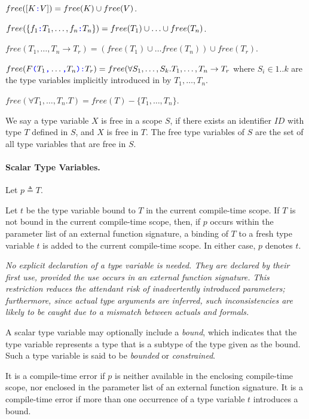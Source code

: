 \documentclass{article}
\begin{document}
 $free([K \texttt{\color{blue} :}{} V]) = free(K) \cup free(V)$.
 
 $free(\{f_1\texttt{\color{blue} :}{} T_1, \ldots, f_n\texttt{\color{blue} :}{} T_n\}) =  free(T_1) \cup \ldots \cup free(T_n)$.
 
 $free(T_1, \ldots, T_n \to T_r) = (free(T_1) \cup \ldots free(T_n)) \cup free(T_r)$. 
 
 $free(F\texttt{\color{blue} (}{} T_1\texttt{\color{blue} ,}{} \ldots\texttt{\color{blue} ,}{} T_n\texttt{\color{blue} )}\texttt{\color{blue} :}{}T_r) = free(\forall S_1, \ldots, S_k. T_1, \ldots, T_n \to T_r$ where $S_i \in 1..k$ are the type variables implicitly introduced in by $T_1, \ldots, T_n$.
 
 $free(\forall T_1, \ldots, T_n.T) = free(T) - \{T_1, \ldots, T_n\}$.
 
 
 We say a type variable $X$ is free in a scope $S$, if there exists an identifier $ID$ with type $T$ defined in $S$, and $X$ is free in $T$. The free type variables of $S$ are the set of all type variables that are free in $S$.

\paragraph{Scalar Type Variables.}
 
 Let $p \triangleq T$.
 
 Let $t$ be the type variable bound to $T$ in the current compile-time scope. If $T$ is not bound in the current compile-time scope, then, if $p$ occurs within  the parameter list of an external function signature,  a binding of $T$ to a fresh type variable $t$ is added to the current compile-time scope. In either case, $p$ denotes  $t$. 
 
 \ScalarTypeVar
 
 {\em 
No explicit declaration of a type variable is needed. They are declared by their first use, provided the use occurs in an external function signature. This restriction reduces the attendant risk of inadvertently introduced parameters; furthermore, since
 actual type arguments are inferred, such inconsistencies are likely to be caught due to a mismatch between actuals and formals.
 } 
 
 A scalar type variable may optionally include a {\em bound}, which indicates that the type variable represents a type that is a subtype of the type given as the bound.
 Such a type variable is said to be {\em bounded} or {\em constrained}.
 
  \TypeBound
 
 It is a compile-time error if $p$ is neither available in the enclosing compile-time scope, nor enclosed in the parameter list of an external function signature.
 It is a compile-time error if more than one occurrence of a type variable  $t$ introduces a bound.
 
\end{document}
